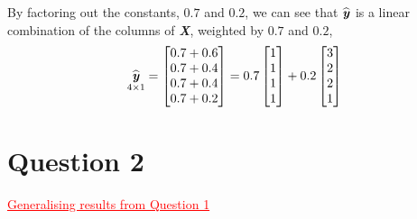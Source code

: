 \documentclass[12pt]{report}
\begin{document}
\justify
By factoring out the constants, $0.7$ and $0.2$, we can see that $\widehat{\textbf{\textit{y}}}$ is a linear combination of the columns of \textbf{\textit{X}}, weighted by $0.7$ and $0.2$,
{$$\underset{4\times1}{\widehat{\textbf{\textit{y}}}}
	=
	\begin{bmatrix}
	0.7+0.6 \\
	0.7+0.4 \\
	0.7+0.4 \\
	0.7+0.2 
	\end{bmatrix}
	=
	0.7
	\begin{bmatrix}
	1 \\
	1 \\
	1 \\
	1 
	\end{bmatrix}
	+
	0.2
	\begin{bmatrix}
	3 \\
	2 \\
	2 \\
	1 
	\end{bmatrix}		
$$}

\newpage
\section*{Question 2}
\textcolor{red}{\underline{Generalising results from Question 1}}
\end{document}
